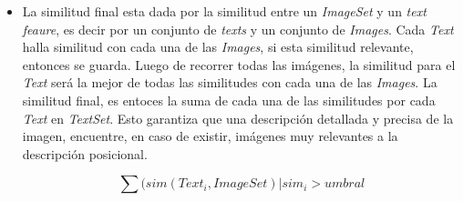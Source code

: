 \begin{itemize}
    \item La similitud final esta dada por la similitud entre un \textit{ImageSet} y un \textit{text feaure}, es decir por un conjunto de \textit{texts} y un conjunto de \textit{Images}. Cada \textit{Text} halla similitud con cada una de las \textit{Images}, si esta similitud relevante, entonces se guarda. Luego de recorrer todas las im\'agenes, la similitud para el \textit{Text} ser\'a la mejor de todas las similitudes con cada una de las \textit{Images}. La similitud final, es entoces la suma de cada una de las similitudes por cada \textit{Text} en \textit{TextSet}. Esto garantiza que una descripci\'on detallada y precisa de la imagen, encuentre, en caso de existir, im\'agenes muy relevantes a la descripci\'on posicional.
        
        \[\sum(sim(Text_i, ImageSet) | sim_i>umbral\]
    

\end{itemize}

